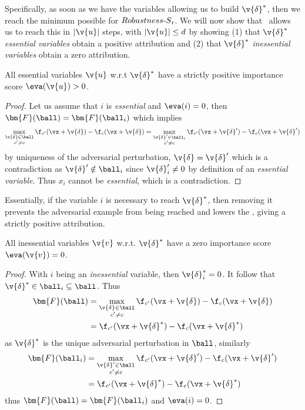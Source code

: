 Specifically, as soon as we have the variables allowing us to build $\v{\delta}^*$, then we reach the minimum possible for ${Robustness\text{-}S\textsubscript{r}}$.
We will now show that \eva~allows us to reach this in $|\v{u}|$ steps, with $|\v{u}| \leq d$ by showing (1) that $\v{\delta}^*$ \textit{essential variables} obtain a positive attribution and (2) that $\v{\delta}^*$ \textit{inessential variables} obtain a zero attribution.

\begin{proposition}
\label{prop:eva:ess}
All essential variables \(\v{u}\) w.r.t \(\v{\delta}^*\) have a strictly positive importance score \(\eva(\v{u}) > 0\). 
\end{proposition}

\begin{proof}
Let us assume that $i$ is \textit{essential} and $\eva(i) = 0$, then $\bm{F}(\ball) = \bm{F}(\ball_i)$ which implies
$$
\max_{\substack{\v{\delta} \in \ball\\c'\neq{}c}} \f_{c'}(\vx + \v{\delta}) - \f_c(\vx + \v{\delta}) = 
\max_{\substack{\v{\delta}' \in \ball_i\\c'\neq{}c}} \f_{c'}(\vx + \v{\delta}') - \f_c(\vx + \v{\delta}')
$$
by uniqueness of the adversarial perturbation, $ \v{\delta} = \v{\delta}' $ which is a contradiction as $\v{\delta}' \notin \ball_i$ since $\v{\delta}'_i \neq 0$ by definition of an \textit{essential variable}. Thus $x_i$ cannot be \textit{essential}, which is a contradiction.
\end{proof}

Essentially, if the variable $i$ is necessary to reach $\v{\delta}^*$, then removing it prevents the adversarial example from being reached and lowers the \adv, giving a strictly positive attribution.

\begin{proposition}
\label{prop:eva:iness}
All inessential variables \(\v{v}\) w.r.t. \(\v{\delta}^*\) have a zero importance score \(\eva(\v{v}) = 0\). 
\end{proposition}

\begin{proof}
With $i$ being an \textit{inessential} variable, then $\v{\delta}^*_i = 0$. It follow that $\v{\delta}^* \in \ball_i \subseteq \ball$. Thus
\begin{align*} 
\bm{F}(\ball) &= \max_{\substack{\v{\delta} \in \ball\\c'\neq{}c}} \f_{c'}(\vx + \v{\delta}) - \f_c(\vx + \v{\delta}) \\
              &= \f_{c'}(\vx + \v{\delta}^*) - \f_c(\vx + \v{\delta}^*)
\end{align*}
as $\v{\delta}^*$ is the unique adversarial perturbation in $\ball$, similarly 
\begin{align*} 
\bm{F}(\ball_i) &= \max_{\substack{\v{\delta}' \in \ball\\c'\neq{}c}} \f_{c'}(\vx + \v{\delta}') - \f_c(\vx + \v{\delta}') \\
              &= \f_{c'}(\vx + \v{\delta}^*) - \f_c(\vx + \v{\delta}^*)
\end{align*}
thus $\bm{F}(\ball) = \bm{F}(\ball_i)$ and $\eva(i) = 0$.
\end{proof}

